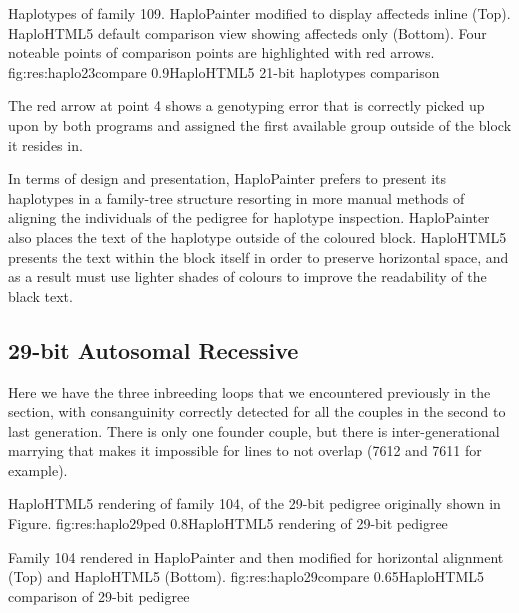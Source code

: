 \pagebreak

	{Haplotypes of family 109. HaploPainter modified to display affecteds inline (Top). HaploHTML5 default comparison view showing affecteds only (Bottom). Four noteable points of comparison points are highlighted with red arrows.\thispagestyle{empty}}
	{fig:res:haplo23compare}
	{0.9}{HaploHTML5 21-bit haplotypes comparison}

The red arrow at point 4 shows a genotyping error that is correctly picked up upon by both programs and assigned the first available group outside of the block it resides in.

In terms of design and presentation, HaploPainter prefers to present its haplotypes in a family-tree structure resorting in more manual methods of aligning the individuals of the pedigree for haplotype inspection. HaploPainter also places the text of the haplotype outside of the coloured block. HaploHTML5 presents the text within the block itself in order to preserve horizontal space, and as a result must use lighter shades of colours to improve the readability of the black text.



\subsection{29-bit Autosomal Recessive}

Here we have the three inbreeding loops that we encountered previously in the section, with consanguinity correctly detected for all the couples in the second to last generation.  There is only one founder couple, but there is inter-generational marrying that makes it impossible for lines to not overlap (7612 and 7611 for example).

	{HaploHTML5 rendering of family 104, of the 29-bit pedigree originally shown in Figure.}
	{fig:res:haplo29ped}
	{0.8}{HaploHTML5 rendering of 29-bit pedigree}
	
	{Family 104 rendered in HaploPainter and then modified for horizontal alignment (Top) and HaploHTML5 (Bottom).}
	{fig:res:haplo29compare}
	{0.65}{HaploHTML5 comparison of 29-bit pedigree}

